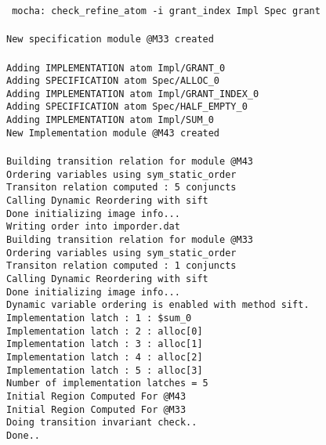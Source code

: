 \mypar
\noindent
{\tt
mocha: check\_refine\_atom  -i {grant\_index} Impl Spec grant \\
\\
New specification module @M33 created \\
\\
Adding IMPLEMENTATION atom Impl/GRANT\_0 \\
Adding SPECIFICATION  atom Spec/ALLOC\_0 \\
Adding IMPLEMENTATION atom Impl/GRANT\_INDEX\_0 \\
Adding SPECIFICATION  atom Spec/HALF\_EMPTY\_0 \\
Adding IMPLEMENTATION atom Impl/SUM\_0 \\
New Implementation module @M43 created \\
\\
Building transition relation for module @M43 \\
Ordering variables using sym\_static\_order \\
Transiton relation computed : 5 conjuncts \\
Calling Dynamic Reordering with sift \\
Done initializing image info... \\
Writing order into imporder.dat \\
Building transition relation for module @M33 \\
Ordering variables using sym\_static\_order \\
Transiton relation computed : 1 conjuncts \\
Calling Dynamic Reordering with sift \\
Done initializing image info... \\
Dynamic variable ordering is enabled with method sift. \\
Implementation latch : 1 : \$sum\_0 \\
Implementation latch : 2 : alloc[0] \\
Implementation latch : 3 : alloc[1] \\
Implementation latch : 4 : alloc[2] \\
Implementation latch : 5 : alloc[3] \\
Number of implementation latches = 5 \\
Initial Region Computed For @M43 \\
Initial Region Computed For @M33 \\
Doing transition invariant check.. \\
Done.. \\
}
